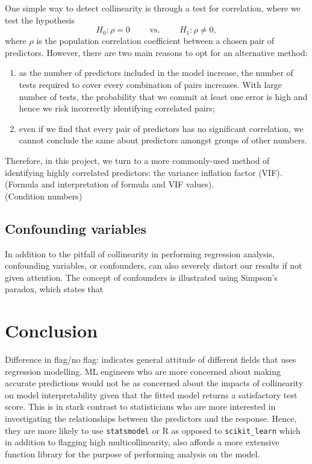 \documentclass[12pt]{article}
\begin{document}
	One simple way to detect collinearity is through a test for correlation, where we test the hypothesis
	$$H_0: \rho=0 \quad\quad\text{ vs. }\quad\quad H_1: \rho\neq 0,$$
	where $\rho$ is the population correlation coefficient between a chosen pair of predictors. However, there are two main reasons to opt for an alternative method: 
	\begin{enumerate}
		\item as the number of predictors included in the model increase, the number of tests required to cover every combination of pairs increases. With large number of tests, the probability that we commit at least one error is high and hence we risk incorrectly identifying correlated pairs;
		\item even if we find that every pair of predictors has no significant correlation, we cannot conclude the same about predictors amongst groups of other numbers. 
	\end{enumerate}
	
	Therefore, in this project, we turn to a more commonly-used method of identifying highly correlated predictors: the variance inflation factor (VIF). (Formula and interpretation of formula and VIF values).\\
	
	(Condition numbers)
	
	\subsection{Confounding variables}
	
	In addition to the pitfall of collinearity in performing regression analysis, confounding variables, or confounders, can also severely distort our results if not given attention. The concept of confounders is illustrated using Simpson's paradox, which states that 
	
	\section{Conclusion}
	
	Difference in flag/no flag: indicates general attitude of different fields that uses regression modelling. ML engineers who are more concerned about making accurate predictions would not be as concerned about the impacts of collinearity on model interpretability given that the fitted model returns a satisfactory test score. This is in stark contrast to statisticians who are more interested in investigating the relationships between the predictors and the response. Hence, they are more likely to use \texttt{statsmodel} or R as opposed to \texttt{scikit\_learn} which in addition to flagging high multicollinearity, also affords a more extensive function library for the purpose of performing analysis on the model.
	
\end{document}
